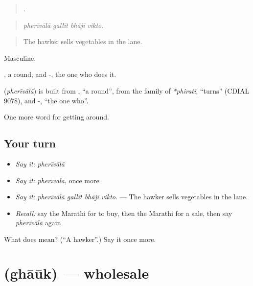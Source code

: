 \begin{quote}
   .
\end{quote}

\begin{quote}
\emph{pherīvālā gallīt bhājī vikto.}
\end{quote}

\begin{quote}
The hawker sells vegetables in the lane.
\end{quote}

Masculine.

, a round, and -, the one who does it.

\begin{cousinweb}
\textbf{} (\emph{pherīvālā}) is built from \textbf{}, \textquotedblleft{}a round\textquotedblright{}, from the family of \emph{*phirati}, \textquotedblleft{}turns\textquotedblright{} (CDIAL 9078), and -, \textquotedblleft{}the one who\textquotedblright{}.
\end{cousinweb}

\begin{grammarlens}[title={What you've built}]
One more word for getting around.
\end{grammarlens}

\subsection*{Your turn}
\begin{itemize}
\raggedright
  \item \emph{Say it:} \emph{pherīvālā}
  \item \emph{Say it:} \emph{pherīvālā}, once more
  \item \emph{Say it:} \emph{pherīvālā gallīt bhājī vikto.} — The hawker sells vegetables in the lane.
  \item \emph{Recall:} say the Marathi for to buy, then the Marathi for a sale, then say \emph{pherīvālā} again
\end{itemize}

\begin{tcolorbox}[breakable,colback=teal!4,colframe=teal!35!black,title={Before you move on}]
What does  mean? (\textquotedblleft{}A hawker\textquotedblright{}.) Say it once more.
\end{tcolorbox}
\section[\texorpdfstring{\mr{घाऊक} (ghāūk)}{घाऊक (ghāūk)}]{ (ghāūk) — wholesale}

